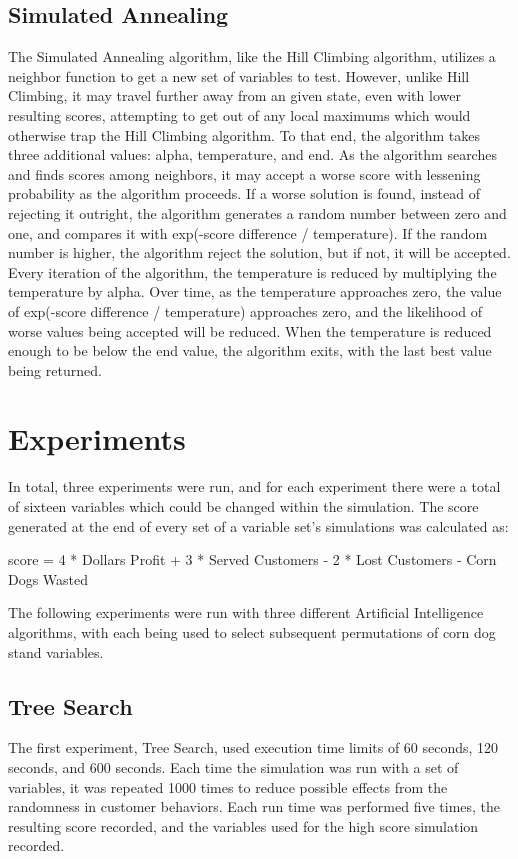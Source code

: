 \documentclass[10pt, twocolumn]{article}
\begin{document}
\subsection{Simulated Annealing}
The Simulated Annealing algorithm, like the Hill Climbing algorithm, utilizes a neighbor function to get
a new set of variables to test. However, unlike Hill Climbing, it may travel further away from an
given state, even with lower resulting scores, attempting to get out of any local maximums which
would otherwise trap the Hill Climbing algorithm. To that end, the algorithm takes three additional values:
alpha, temperature, and end. As the algorithm searches and finds scores among neighbors, it may accept a worse
score with lessening probability as the algorithm proceeds. \cite{codeproject} If a worse
solution is found, instead of rejecting it outright, the algorithm generates a random number
between zero and one, and compares it with exp(-score difference / temperature). If the random
number is higher, the algorithm reject the solution, but if not, it will be accepted.
Every iteration of the algorithm, the temperature is reduced by multiplying the temperature by alpha.
Over time, as the temperature approaches zero, the value of
exp(-score difference / temperature) approaches zero, and the likelihood of worse values being accepted
will be reduced. When the temperature is reduced enough to be below the end value, the
algorithm exits, with the last best value being returned.

\section{Experiments}
In total, three experiments were run, and for each experiment there were a total of sixteen
variables which could be changed within the simulation. The score generated at the end of every set of
a variable set's simulations was calculated as:

\medskip
score = 4 * Dollars Profit + 3 * Served Customers - 2 * Lost Customers - Corn Dogs Wasted
\medskip

The following experiments were run with three different Artificial Intelligence algorithms, with
each being used to select subsequent permutations of corn dog stand variables.

\subsection{Tree Search}
The first experiment, Tree Search, used execution time limits of 60 seconds, 120 seconds, and
600 seconds. Each time the simulation was run with a set of variables, it was repeated 1000
times to reduce possible effects from the randomness in customer behaviors. Each run time
was performed five times, the resulting score recorded, and the variables used for the high
score simulation recorded.
\end{document}
